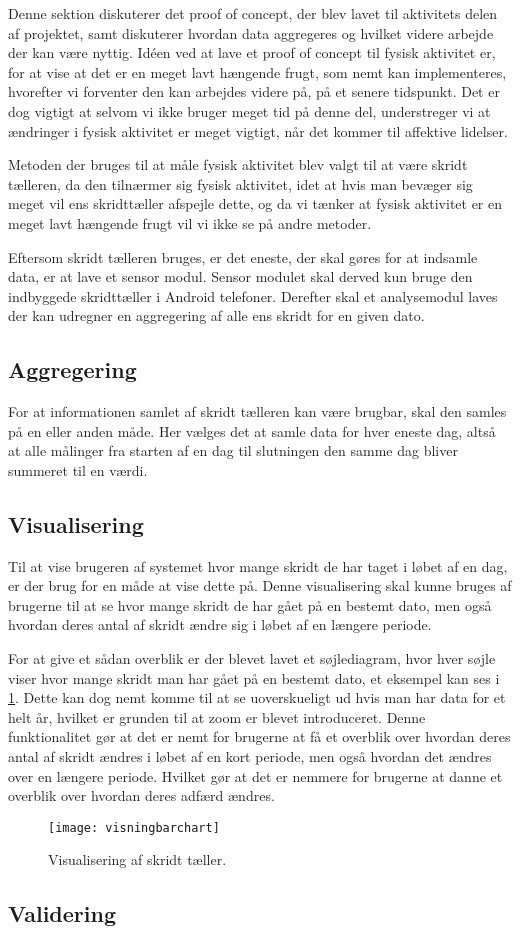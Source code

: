 Denne sektion diskuterer det proof of concept, der blev lavet til aktivitets delen af projektet, samt diskuterer hvordan data aggregeres og hvilket videre arbejde der kan være nyttig. 
Idéen ved at lave et proof of concept til fysisk aktivitet er, for at vise at det er en meget lavt hængende frugt, som nemt kan implementeres, hvorefter vi forventer den kan arbejdes videre på, på et senere tidspunkt. 
Det er dog vigtigt at selvom vi ikke bruger meget tid på denne del, understreger vi at ændringer i fysisk aktivitet er meget vigtigt, når det kommer til affektive lidelser. 

Metoden der bruges til at måle fysisk aktivitet blev valgt til at være skridt tælleren, da den tilnærmer sig fysisk aktivitet, idet at hvis man bevæger sig meget vil ens skridttæller afspejle dette, og da vi tænker at fysisk aktivitet er en meget lavt hængende frugt vil vi ikke se på andre metoder.

Eftersom skridt tælleren bruges, er det eneste, der skal gøres for at indsamle data, er at lave et sensor modul.
Sensor modulet skal derved kun bruge den indbyggede skridttæller i Android telefoner.
Derefter skal et analysemodul laves der kan udregner en aggregering af alle ens skridt for en given dato.

\subsection{Aggregering}
For at informationen samlet af skridt tælleren kan være brugbar, skal den samles på en eller anden måde.
Her vælges det at samle data for hver eneste dag, altså at alle målinger fra starten af en dag til slutningen den samme dag bliver summeret til en værdi.

\subsection{Visualisering}\label{sec:aktivitetVis}
Til at vise brugeren af systemet hvor mange skridt de har taget i løbet af en dag, er der brug for en måde at vise dette på.
Denne visualisering skal kunne bruges af brugerne til at se hvor mange skridt de har gået på en bestemt dato, men også hvordan deres antal af skridt ændre sig i løbet af en længere periode.

For at give et sådan overblik er der blevet lavet et søjlediagram, hvor hver søjle viser hvor mange skridt man har gået på en bestemt dato, et eksempel kan ses i \cref{fig:skridttaeller}.
Dette kan dog nemt komme til at se uoverskueligt ud hvis man har data for et helt år, hvilket er grunden til at zoom er blevet introduceret.
Denne funktionalitet gør at det er nemt for brugerne at få et overblik over hvordan deres antal af skridt ændres i løbet af en kort periode, men også hvordan det ændres over en længere periode.
Hvilket gør at det er nemmere for brugerne at danne et overblik over hvordan deres adfærd ændres.

\begin{figure}[h]
	\centering
	\texttt{[image: visningbarchart]}
	\caption{Visualisering af skridt tæller.}
	\label{fig:skridttaeller}
\end{figure}

\subsection{Validering}